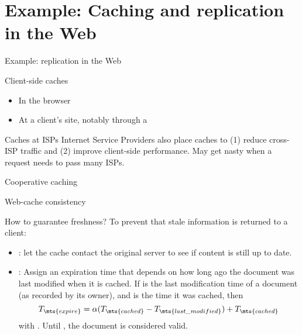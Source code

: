 \section{Example: Caching and replication in the Web}
\begin{slide}{Example: replication in the Web}
  \begin{block}{Client-side caches}
    \begin{itemize}
    \item In the browser
    \item At a client's site, notably through a 
    \end{itemize}
  \end{block}
  \begin{block}{Caches at ISPs}
    Internet Service Providers also place caches to (1) reduce cross-ISP traffic and (2) improve client-side
    performance. May get nasty when a request needs to pass many ISPs.
  \end{block}
\end{slide}
  \begin{slide}{Cooperative caching}
    \begin{centerfig}
    \end{centerfig}
  \end{slide}
\begin{slide}{Web-cache consistency}
  \begin{block}{How to guarantee freshness?}
    To prevent that stale information is returned to a client:
    \begin{itemize}
    \item {}: let the cache contact the original server to see if content is still up to date.
    \item {}: Assign an expiration time  that depends on how long ago the
      document was last modified when it is cached. If  is the last
      modification time of a document (as recorded by its owner), and  is the time
      it was cached, then
      \[
      T_{\mts{expire}} = \alpha (T_{\mts{cached}} - T_{\mts{last\_modified}}) + T_{\mts{cached}}
      \]
      with . Until , the document is considered valid.
    \end{itemize}
  \end{block}
\end{slide}
